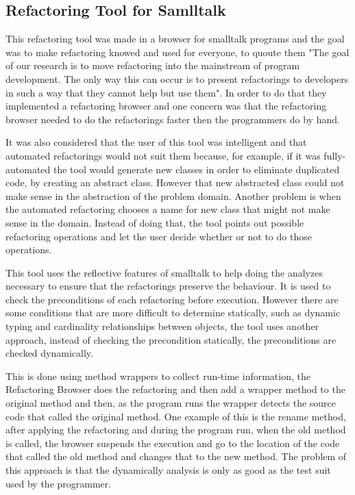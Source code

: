 
\subsection{Refactoring Tool for Samlltalk}%

This refactoring tool \cite{roberts1997refactoring} was made in a browser for smalltalk programs and the goal was to make refactoring knowed and used for everyone, to quoute them "The goal of our research is to move refactoring into the mainstream of program development. The only way this can occur is to present refactorings to developers in such a way that they cannot help but use them". 
In order to do that they implemented a refactoring browser and one concern was that the refactoring browser needed to do the refactorings faster then the programmers do by hand. 

It was also considered that the user of this tool was intelligent and that automated refactorings would not suit them because, for example, if it was fully-automated the tool would generate new classes in order to eliminate duplicated code, by creating an abstract class.
However that new abstracted class could not make sense in the abstraction of the problem domain. 
Another problem is when the automated refactoring chooses a name for new class that might not make sense in the domain. 
Instead of doing that, the tool points out possible refactoring operations and let the user decide whether or not to do those operations.

This tool uses the reflective features of smalltalk to help doing the analyzes necessary to ensure that the refactorings preserve the behaviour. 
It is used to check the preconditions of each refactoring before execution. However there are some conditions that are more difficult to determine statically, such as dynamic typing and cardinality relationships between objects, the tool uses another approach, instead of checking the precondition statically, the preconditions are checked dynamically. 

This is done using method wrappers to collect run-time information, the Refactoring Browser does the refactoring and then add a wrapper method to the original method and then, as the program runs the wrapper detects the source code that called the original method.
One example of this is the rename method, after applying the refactoring and during the program run, when the old method is called, the browser suspends the execution and go to the location of the code that called the old method and changes that to the new method. The problem of this approach is that the dynamically analysis is only as good as the test suit used by the programmer.